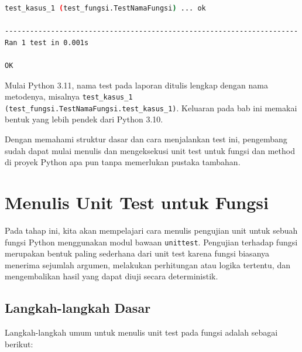 \begin{lstlisting}[language=bash, caption={Contoh laporan hasil test}, label={lst:b10-laporan-hasil-test}]
test_kasus_1 (test_fungsi.TestNamaFungsi) ... ok

----------------------------------------------------------------------
Ran 1 test in 0.001s

OK
\end{lstlisting}

Mulai Python 3.11, nama test pada laporan ditulis lengkap dengan nama metodenya, misalnya \texttt{test\_kasus\_1 (test\_fungsi.TestNamaFungsi.test\_kasus\_1)}. Keluaran pada bab ini memakai bentuk yang lebih pendek dari Python 3.10.

Dengan memahami struktur dasar dan cara menjalankan test ini, pengembang sudah dapat mulai menulis dan mengeksekusi unit test untuk fungsi dan method di proyek Python apa pun tanpa memerlukan pustaka tambahan.


\section{Menulis Unit Test untuk Fungsi}

Pada tahap ini, kita akan mempelajari cara menulis pengujian unit untuk sebuah fungsi Python menggunakan modul bawaan \texttt{unittest}.  
Pengujian terhadap fungsi merupakan bentuk paling sederhana dari unit test karena fungsi biasanya menerima sejumlah argumen, melakukan perhitungan atau logika tertentu, dan mengembalikan hasil yang dapat diuji secara deterministik.

\subsection{Langkah-langkah Dasar}

Langkah-langkah umum untuk menulis unit test pada fungsi adalah sebagai berikut:

